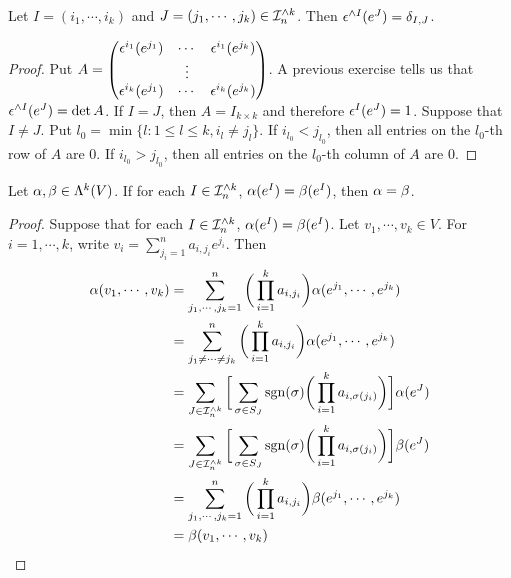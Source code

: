 \documentclass{book}
\begin{document}
	\begin{ex}
		Let $I = (i_1, \cdots, i_k)$ and $J = (j_1, \cdots, j_k) \in \mathcal{I}_n^{\wedge k}$. Then $\epsilon^{\wedge I} (e^J) = \delta_{I,J}$.
	\end{ex}

	\begin{proof}
		Put $A = \begin{pmatrix}
			\epsilon^{i_1}(e^{j_1}) & \cdots & \epsilon^{i_1}(e^{j_k}) \\
			& \vdots & \\
			\epsilon^{i_k}(e^{j_1}) & \cdots & \epsilon^{i_k}(e^{j_k}) 
		\end{pmatrix}$.
		A previous exercise tells us that $\epsilon^{\wedge I} (e^J) = \det A$.
		If $I = J$, then $A = I_{k\times k}$ and therefore $\epsilon^I(e^J) = 1$. Suppose that $I \neq J$. Put $l_0 = \min \{l: 1 \leq l \leq k, i_l \neq j_l\}$. If $i_{l_0} < j_{l_0}$, then all entries on the $l_0$-th row of $A$ are $0$. If $i_{l_0} > j_{l_0}$, then all entries on the $l_0$-th column of $A$ are $0$.
	\end{proof}

	\begin{ex}
		Let $\alpha , \beta \in \Lambda^k(V)$. If for each $I \in \mathcal{I}_n^{\wedge k}$, $\alpha(e^I) = \beta(e^I)$, then $\alpha = \beta$.
	\end{ex}

	\begin{proof}
		Suppose that for each $I \in \mathcal{I}_n^{\wedge k}$, $\alpha(e^I) = \beta(e^I)$. Let $v_1, \cdots, v_k \in V$. For $i = 1, \cdots, k$, write $v_i = \sum_{j_i = 1}^n a_{i,j_i}e^{j_i}$. Then 
		\begin{align*}
			\alpha(v_1, \cdots, v_k) 
			& = \sum_{j_1, \cdots, j_k =1}^n \bigg( \prod_{i=1}^k a_{i, j_i} \bigg) \alpha(e^{j_1}, \cdots, e^{j_k}) \\
			& = \sum_{j_1 \neq \cdots \neq j_k}^n \bigg( \prod_{i=1}^k a_{i, j_i} \bigg) \alpha(e^{j_1}, \cdots, e^{j_k}) \\
			& = \sum_{J \in \mathcal{I}_n^{\wedge k}} \bigg [ \sum_{\sigma \in S_J} \operatorname{sgn}(\sigma) \bigg( \prod_{i=1}^k a_{i, \sigma(j_i)} \bigg) \bigg] \alpha(e^J) \\
			& = \sum_{J \in \mathcal{I}_n^{\wedge k}} \bigg [ \sum_{\sigma \in S_J} \operatorname{sgn}(\sigma) \bigg( \prod_{i=1}^k a_{i, \sigma(j_i)} \bigg) \bigg] \beta(e^J) \\
			& = \sum_{j_1, \cdots, j_k =1}^n \bigg( \prod_{i=1}^k a_{i, j_i} \bigg) \beta(e^{j_1}, \cdots, e^{j_k}) \\
			& = \beta(v_1, \cdots, v_k) 
		\end{align*}
	
	\end{proof}
\end{document}
